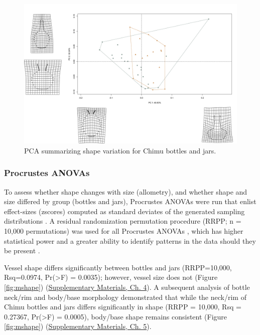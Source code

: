 \documentclass[]{interact}
\theoremstyle{plain}%
\theoremstyle{definition}
\theoremstyle{remark}
\begin{document}
\begin{figure}\centering
\includegraphics[width=\linewidth]{figs/pca-warp-botjar.jpg}
\caption{PCA summarizing shape variation for Chimu bottles and jars. }
\label{fig:pca}
\end{figure}

\hypertarget{procrustes-anovas}{%
\subsubsection{Procrustes ANOVAs}\label{procrustes-anovas}}

To assess whether shape changes with size (allometry), and whether shape
and size differed by group (bottles and jars), Procrustes ANOVAs
\citep{RN1749} were run that enlist effect-sizes (zscores) computed as
standard deviates of the generated sampling distributions
\citep{RN1756}. A residual randomization permutation procedure (RRPP; n
= 10,000 permutations) was used for all Procrustes ANOVAs
\citep{RN1655,RN11775}, which has higher statistical power and a greater
ability to identify patterns in the data should they be present
\citep{RN1719}.

Vessel shape differs significantly between bottles and jars
(RRPP=10,000, Rsq=0.0974, Pr(\textgreater F) = 0.0035); however, vessel
size does not (Figure \ref{fig:mshape})
(\href{https://seldenlab.github.io/peru.bottle.jar/}{Supplementary
Materials, Ch. 4}). A subsequent analysis of bottle neck/rim and
body/base morphology demonstrated that while the neck/rim of Chimu
bottles and jars differs significantly in shape (RRPP = 10,000, Rsq =
0.27367, Pr(\textgreater F) = 0.0005), body/base shape remains
consistent (Figure \ref{fig:mshape})
(\href{https://seldenlab.github.io/peru.bottle.jar/}{Supplementary
Materials, Ch. 5}).
\end{document}

